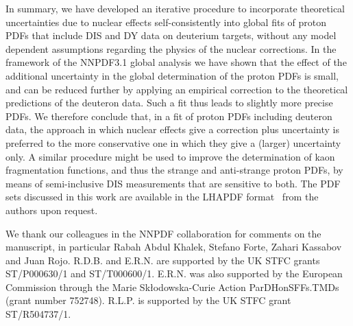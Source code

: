 \documentclass[11pt,a4paper]{article}
\begin{document}
In summary, we have developed an iterative procedure to incorporate theoretical
uncertainties due to nuclear effects self-consistently into global fits of
proton PDFs that include DIS and DY data on deuterium targets, without
any model dependent assumptions regarding the physics of the nuclear
corrections. In the framework of the NNPDF3.1 global analysis we have shown
that the effect of the additional uncertainty in the global determination of
the proton PDFs is small, and can be reduced further by applying an empirical
correction to the theoretical predictions of the deuteron data. 
Such a fit thus leads to slightly more precise PDFs. We therefore
conclude that, in a fit of proton PDFs including deuteron data,
the approach in which nuclear effects give a correction plus uncertainty
is preferred to the more conservative one in which they give a (larger)
uncertainty only. A similar procedure might be used to improve
the determination of kaon fragmentation functions, and thus the strange and
anti-strange proton PDFs, by means of semi-inclusive DIS measurements that are
sensitive to both. The PDF sets discussed in this work are available in the
{\sc LHAPDF} format~\cite{Buckley:2014ana} from the authors upon request.

\vspace{0.2cm}

 We thank our colleagues in the NNPDF
collaboration for comments on the manuscript, in particular Rabah Abdul Khalek,
Stefano Forte, Zahari Kassabov and Juan Rojo.
R.D.B. and E.R.N. are supported by the UK STFC
grants ST/P000630/1 and ST/T000600/1. E.R.N. was also supported by the European
Commission through the Marie Sk\l odowska-Curie Action ParDHonSFFs.TMDs
(grant number 752748). R.L.P. is supported by the UK STFC grant ST/R504737/1.


\end{document}
